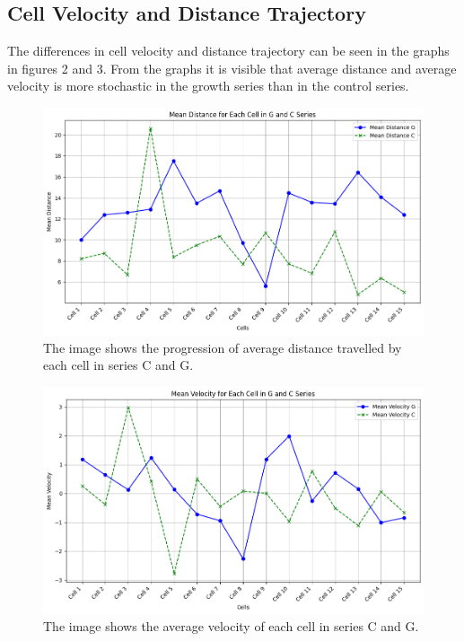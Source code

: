 \documentclass{article}
\begin{document}
\subsection*{Cell Velocity and Distance Trajectory}

The differences in cell velocity and distance trajectory can be seen in the graphs in figures 2 and 3. From the graphs it is visible that average distance and average velocity is more stochastic in the growth series than in the control series. 


\begin{figure}[h!]
\centering
\includegraphics[width=0.75\linewidth]{Report/RImages/Graphs/mean_distance_g_and_c.png}
\caption{\label{fig:Mean_Distance}The image shows the progression of average distance travelled by each cell in series C and G.}
\end{figure}

\begin{figure}[h!]
\centering
\includegraphics[width=0.75\linewidth]{Report/RImages/Graphs/mean_velocity_g_and_c.png}
\caption{\label{fig:Mean_Velocity}The image shows the average velocity of each cell in series C and G.}
\end{figure}
\end{document}
